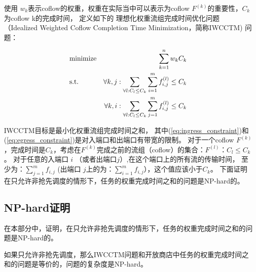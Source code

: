 使用 $w_k$表示coflow的权重，权重在实际当中可以表示为coflow $F^{(k)}$的重要性，$C_k$为coflow k的完成时间，
定义如下的 理想化权重流组完成时间优化问题（Idealized Weighted Coflow Completion Time Minimization，简称IWCCTM) 问题：

\begin{eqnarray}
& {\rm minimize} & \sum_{k=1}^{n} w_{k} C_{k} \label{eq:WCCO-SC} \\
& {\rm s.t.} &\forall k,j:  \sum_{\forall l:C_l \leq C_k}\sum_{i=1}^{m}f_{i,j}^{(l)} \leq C_k  \label{eq:ingress_constraint}\\
&&\forall k,i: \sum_{\forall l:C_l \leq C_k}\sum_{j=1}^{m}f_{i,j}^{(l)} \leq C_k   \label{eq:egress_constraint}
\end{eqnarray}

IWCCTM目标是最小化权重流组完成时间之和，
其中(\ref{eq:ingress_constraint})和(\ref{eq:egress_constraint})是对入端口和出端口有带宽的限制。
对于一个coflow $F^{(k)}$，完成时间是$C_k$，考虑在$F^{(k)}$完成之前的流组（coflow）的集合：$F^{(l)}$：$C_l \le C_k$。
对于任意的入端口 $i$ （或者出端口$j$）,在这个端口上的所有流的传输时间，
至少为：$\sum_{j=1}^{m}f_{i,j}$ (出端口 $j$上的为：$\sum_{i=1}^{m}f_{i,j}$），这个值应该小于$C_k$。
下面证明在只允许非抢先调度的情形下，任务的权重完成时间之和的问题是NP-hard的。

\subsection{NP-hard证明}
在本部分中，证明，在只允许非抢先调度的情形下，任务的权重完成时间之和的问题是NP-hard的。

 \begin{lemma}\label{IWCCTM-proof2}
 如果只允许非抢先调度，那么IWCCTM问题和开放商店中任务的权重完成时间之和的问题是等价的，问题的复杂度是NP-hard。
\end{lemma}

